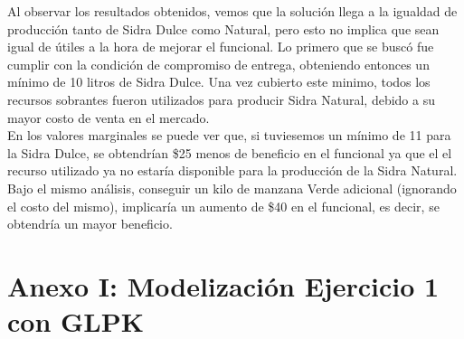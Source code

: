 \documentclass[a4paper,10pt]{article}
\begin{document}
Al observar los resultados obtenidos, vemos que la soluci\'on llega a la igualdad de producci\'on tanto de Sidra Dulce como Natural, pero esto no implica que sean igual de \'utiles a la hora de mejorar el funcional. Lo primero que se busc\'o fue cumplir con la condici\'on de compromiso de entrega, obteniendo entonces un m\'inimo de 10 litros de Sidra Dulce. Una vez cubierto este minimo, todos los recursos sobrantes fueron utilizados para producir Sidra Natural, debido a su mayor costo de venta en el mercado.\\

En los valores marginales se puede ver que, si tuviesemos un m\'inimo de 11 para la Sidra Dulce, se obtendr\'ian \$25 menos de beneficio en el funcional ya que el el recurso utilizado ya no estar\'ia disponible para la producci\'on de la Sidra Natural. Bajo el mismo an\'alisis, conseguir un kilo de manzana Verde adicional (ignorando el costo del mismo), implicar\'ia un aumento de \$40 en el funcional, es decir, se obtendr\'ia un mayor beneficio.


\newpage

\section{Anexo I: Modelizaci\'on Ejercicio 1 con GLPK}
\end{document}
